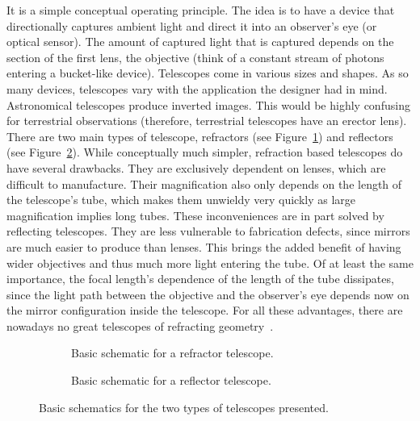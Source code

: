 It is a simple conceptual operating principle. The idea is to have a
device that directionally captures ambient light and direct it into an
observer's eye (or optical sensor). The amount of captured light that is
captured depends on the section of the first lens, the objective (think of a constant
stream of photons entering a bucket-like device). Telescopes come in
various sizes and shapes. As so many devices, telescopes vary with the
application the designer had in mind. Astronomical telescopes produce
inverted images. This would be highly confusing for terrestrial
observations (therefore, terrestrial telescopes have an erector lens).
There are two main types of telescope, refractors (see
Figure~\ref{fig:refractor_telescopes}) and reflectors (see
Figure~\ref{fig:reflector_telescopes}). While conceptually much simpler,
refraction based telescopes do have several drawbacks. They are
exclusively dependent on lenses, which are difficult to manufacture.
Their magnification also only depends on the length of the telescope's
tube, which makes them unwieldy very quickly as large magnification
implies long tubes. These inconveniences are in part solved by
reflecting telescopes. They are less vulnerable to fabrication defects,
since mirrors are much easier to produce than lenses. This brings the
added benefit of having wider objectives and thus much more light
entering the tube. Of at least the same importance, the focal length's
dependence of the length of the tube dissipates, since the light path
between the objective and the observer's eye depends now on the mirror
configuration inside the telescope. For all these advantages, there are
nowadays no great telescopes of refracting geometry~\cite{Smith2000,
Hecht2016}.

\begin{figure}
      \begin{subfigure}[b]{.45\linewidth}
        \centering
        \missingfigure{}
        \caption{Basic schematic for a refractor
        telescope.}\label{fig:refractor_telescopes}
      \end{subfigure}%
      \hfill
      \begin{subfigure}[b]{.45\linewidth}
        \centering
        \missingfigure{}
        \caption{Basic schematic for a reflector
        telescope.}\label{fig:reflector_telescopes}
      \end{subfigure}
      \caption{Basic schematics for the two types of telescopes
      presented.}\label{fig:telescope_types_schematics}
\end{figure}

